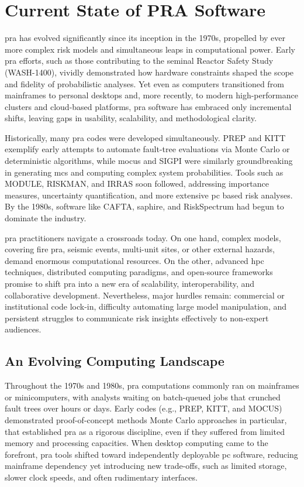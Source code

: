 \chapter{Current State of PRA Software}
\acrfull{pra} has evolved significantly since its inception in the 1970s, propelled by ever more complex risk models and simultaneous leaps in computational power. Early \acrshort{pra} efforts, such as those contributing to the seminal Reactor Safety Study (WASH-1400), vividly demonstrated how hardware constraints shaped the scope and fidelity of probabilistic analyses. Yet even as computers transitioned from mainframes to personal desktops and, more recently, to modern high-performance clusters and cloud-based platforms, \acrshort{pra} software has embraced only incremental shifts, leaving gaps in usability, scalability, and methodological clarity.

Historically, many \acrshort{pra} codes were developed simultaneously. PREP and KITT exemplify early attempts to automate fault-tree evaluations via Monte Carlo or deterministic algorithms, while \acrshort{mocus} and SIGPI were similarly groundbreaking in generating \acrfull{mcs} and computing complex system probabilities. Tools such as MODULE, RISKMAN, and IRRAS soon followed, addressing importance measures, uncertainty quantification, and more extensive \acrfull{pc} based risk analyses. By the 1980s, software like CAFTA, \acrshort{saphire}, and RiskSpectrum had begun to dominate the industry.

\acrshort{pra} practitioners navigate a crossroads today. On one hand, complex models, covering fire \acrshort{pra}, seismic events, multi-unit sites, or other external hazards, demand enormous computational resources. On the other, advanced \acrfull{hpc} techniques, distributed computing paradigms, and open-source frameworks promise to shift \acrshort{pra} into a new era of scalability, interoperability, and collaborative development. Nevertheless, major hurdles remain: commercial or institutional code lock-in, difficulty automating large model manipulation, and persistent struggles to communicate risk insights effectively to non-expert audiences.




\section{An Evolving Computing Landscape}

Throughout the 1970s and 1980s, \acrshort{pra} computations commonly ran on mainframes or minicomputers, with analysts waiting on batch-queued jobs that crunched fault trees over hours or days. Early codes (e.g., PREP, KITT, and MOCUS) demonstrated proof-of-concept methods Monte Carlo approaches in particular, that established \acrshort{pra} as a rigorous discipline, even if they suffered from limited memory and processing capacities. When desktop computing came to the forefront, \acrshort{pra} tools shifted toward independently deployable \acrshort{pc} software, reducing mainframe dependency yet introducing new trade-offs, such as limited storage, slower clock speeds, and often rudimentary interfaces.

